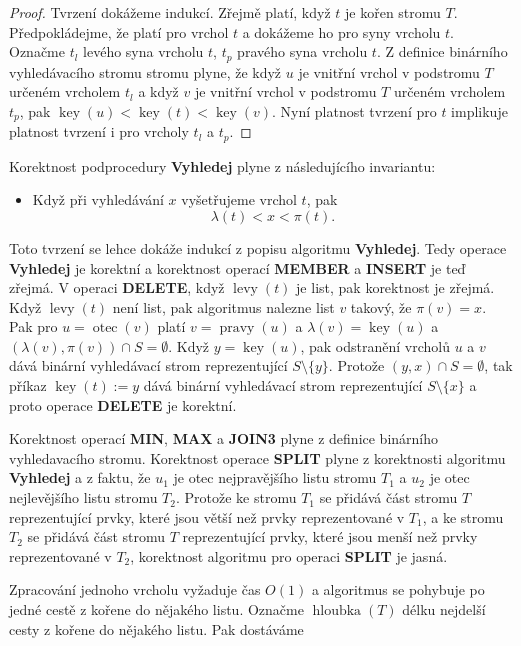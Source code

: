 \documentclass[a4paper,12pt]{article}
\DeclareMathOperator*{\otec}{otec}
\DeclareMathOperator*{\levy}{levy}
\DeclareMathOperator*{\pravy}{pravy}
\DeclareMathOperator*{\key}{key}
\DeclareMathOperator*{\hloubka}{hloubka}
\begin{document}
\begin{proof}Tvrzení dokážeme indukcí.  Zřejmě platí, 
když $t$ je kořen stromu $T$.  Předpokládej\-me, že platí pro vrchol 
$t$ a doká\-že\-me ho pro syny vrcholu $t$.  Označme $t_l$ levého syna 
vrcholu $t$, $t_p$ pravého syna vrcholu $t$.  Z definice binárního 
vyhledávacího stromu stromu plyne, že když $u$ je vnitřní 
vrchol v podstromu $T$ určeném vrcholem $t_l$ a když $v$ je vnitřní 
vrchol v podstromu $T$ určeném vrcholem $t_p$, pak 
$\key(u)<\key(t)<\key(v)$.  Nyní platnost tvrzení pro $t$ 
implikuje platnost tvrzení i pro vrcholy $t_l$ a $t_p$. 
\end{proof}

Korektnost podprocedury {\bf Vyhledej} plyne z 
následujícího invariantu:
\begin{itemize}
\item
Když při vyhledávání $x$ vyšetřujeme vrchol $
t$, pak 
$$\lambda (t)<x<\pi (t).$$
\end{itemize}
Toto tvrzení se lehce dokáže indukcí z popisu algoritmu 
{\bf Vy\-hledej}.  Tedy operace {\bf Vy\-hledej} je korektní a korekt\-nost 
ope\-rací {\bf MEMBER} a {\bf INSERT} je teď zřejmá. V operaci {\bf DELE\-TE},  
když $\levy(t)$ je list, pak korektnost je zřejmá. Když $\levy
(t)$ 
není list, pak algoritmus nalezne list $v$ takový, že $\pi(v)=x$. 
Pak pro $u=\otec(v)$ platí $v=\pravy(u)$ a $\lambda(v)=\key(u)$ a 
$(\lambda(v),\pi(v))\cap S=\emptyset$. Když $y=\key(u)$, pak 
odstranění vrcholů $u$ a $v$ dává binární vyhledávací strom reprezentující $S\setminus \{y\}$. 
Protože $(y,x)\cap S=\emptyset$, tak příkaz $\key(t):=y$ dává binární 
vyhledávací strom reprezentující $S\setminus \{x\}$ a proto operace 
{\bf DELETE} je korektní. 

Korektnost operací {\bf MIN}, {\bf MAX} a {\bf JOIN3} plyne z definice 
binárního vyhledavacího stromu.  Korektnost operace {\bf SPLIT }
plyne z korektnosti algoritmu {\bf Vyhledej} a z faktu, že $u_
1$ je otec 
nej\-pravějšího listu stromu $T_1$ a $u_2$ je otec nejlevějšího listu stromu $T_2$.  
Protože ke stromu $T_1$ se přidává část stromu $T$ reprezentující 
prvky, které jsou větší než prvky reprezentované v $
T_1$, a ke 
stromu $T_2$ se přidává část stromu $T$ reprezentující prvky, 
které jsou menší než prvky reprezentované v $T_2$, korektnost 
algoritmu pro operaci {\bf SPLIT} je jasná.  

Zpracování jednoho vrcholu vyžaduje čas $O(
1)$ a 
algoritmus se pohybuje po jedné cestě z kořene do 
nějakého listu. Označme $\hloubka(T)$ délku nejdelší cesty 
z kořene do nějakého listu. Pak dostáváme
\end{document}
